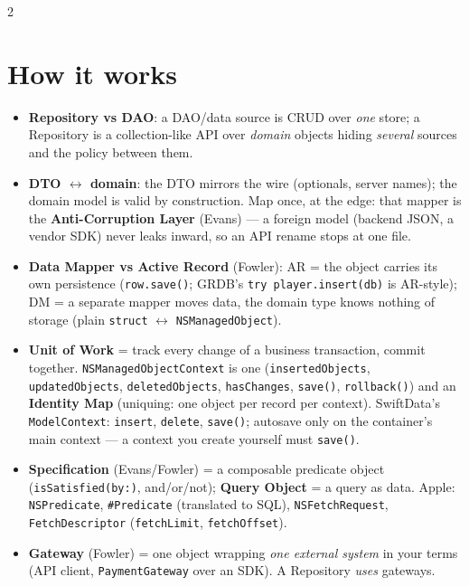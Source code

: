 \documentclass[8pt]{extarticle}
\begin{document}
\begin{multicols}{2}
\raggedright

\section{How it works}
\begin{itemize}
  \item \textbf{Repository vs DAO}: a DAO/data source is CRUD over \emph{one} store; a Repository
        is a collection-like API over \emph{domain} objects hiding \emph{several} sources and the
        policy between them.
  \item \textbf{DTO $\leftrightarrow$ domain}: the DTO mirrors the wire (optionals, server names);
        the domain model is valid by construction. Map once, at the edge: that mapper is the
        \textbf{Anti-Corruption Layer} (Evans) — a foreign model (backend JSON, a vendor SDK)
        never leaks inward, so an API rename stops at one file.
  \item \textbf{Data Mapper vs Active Record} (Fowler): AR = the object carries its own persistence
        (\texttt{row.save()}; GRDB's \texttt{try player.insert(db)} is AR-style); DM = a separate
        mapper moves data, the domain type knows nothing of storage (plain \texttt{struct}
        $\leftrightarrow$ \texttt{NSManagedObject}).
  \item \textbf{Unit of Work} = track every change of a business transaction, commit together.
        \texttt{NSManagedObjectContext} is one (\texttt{insertedObjects}, \texttt{updatedObjects},
        \texttt{deletedObjects}, \texttt{hasChanges}, \texttt{save()}, \texttt{rollback()}) and an
        \textbf{Identity Map} (uniquing: one object per record per context). SwiftData's
        \texttt{ModelContext}: \texttt{insert}, \texttt{delete}, \texttt{save()}; autosave only on the
        container's main context — a context you create yourself must \texttt{save()}.
  \item \textbf{Specification} (Evans/Fowler) = a composable predicate object
        (\texttt{isSatisfied(by:)}, and/or/not); \textbf{Query Object} = a query as data. Apple:
        \texttt{NSPredicate}, \texttt{\#Predicate} (translated to SQL), \texttt{NSFetchRequest},
        \texttt{FetchDescriptor} (\texttt{fetchLimit}, \texttt{fetchOffset}).
  \item \textbf{Gateway} (Fowler) = one object wrapping \emph{one external system} in your terms
        (API client, \texttt{PaymentGateway} over an SDK). A Repository \emph{uses} gateways.
\end{itemize}


\end{multicols}
\end{document}
